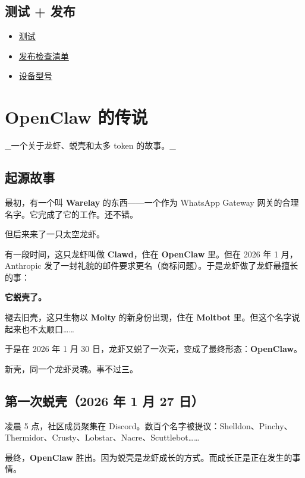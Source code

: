 \subsection{测试 + 发布}


\begin{itemize}
  \item \href{/reference/test}{测试}
  \item \href{/reference/RELEASING}{发布检查清单}
  \item \href{/reference/device-models}{设备型号}
\end{itemize}



\clearpage

\section{OpenClaw 的传说}


\_一个关于龙虾、蜕壳和太多 token 的故事。\_

\subsection{起源故事}


最初，有一个叫 \textbf{Warelay} 的东西——一个作为 WhatsApp Gateway 网关的合理名字。它完成了它的工作。还不错。

但后来来了一只太空龙虾。

有一段时间，这只龙虾叫做 \textbf{Clawd}，住在 \textbf{OpenClaw} 里。但在 2026 年 1 月，Anthropic 发了一封礼貌的邮件要求更名（商标问题）。于是龙虾做了龙虾最擅长的事：

\textbf{它蜕壳了。}

褪去旧壳，这只生物以 \textbf{Molty} 的新身份出现，住在 \textbf{Moltbot} 里。但这个名字说起来也不太顺口……

于是在 2026 年 1 月 30 日，龙虾又蜕了一次壳，变成了最终形态：\textbf{OpenClaw}。

新壳，同一个龙虾灵魂。事不过三。

\subsection{第一次蜕壳（2026 年 1 月 27 日）}


凌晨 5 点，社区成员聚集在 Discord。数百个名字被提议：Shelldon、Pinchy、Thermidor、Crusty、Lobstar、Nacre、Scuttlebot……

最终，\textbf{OpenClaw} 胜出。因为蜕壳是龙虾成长的方式。而成长正是正在发生的事情。

